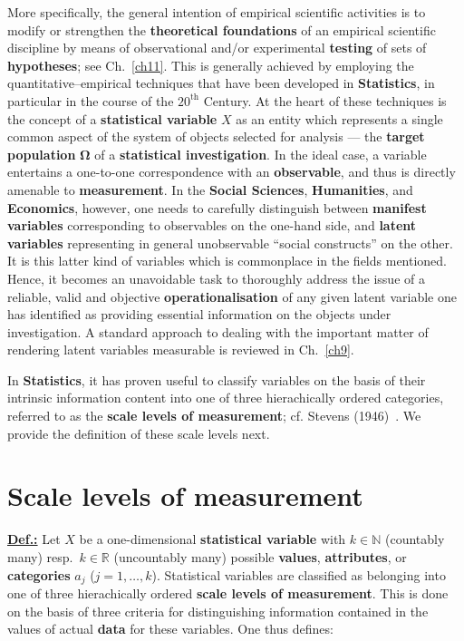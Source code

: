 \medskip
\noindent
More specifically, the general intention of empirical 
scientific activities is to modify or strengthen the
\textbf{theoretical foundations} of an empirical scientific
discipline by means of observational and/or experimental
\textbf{testing} of sets of \textbf{hypotheses}; see
Ch.~\ref{ch11}. This is generally 
achieved by employing the quantitative--empirical techniques that 
have been developed in \textbf{Statistics}, in particular in the 
course of the $20^\mathrm{th}$ Century. At the heart of these 
techniques is the concept of a \textbf{statistical variable} $X$ as 
an entity which represents a single common aspect of the system of 
objects selected for analysis --- the \textbf{target population} 
$\boldsymbol{\Omega}$ of a \textbf{statistical investigation}. In
the ideal case, a variable entertains a one-to-one correspondence
with an \textbf{observable}, and thus is directly amenable to
\textbf{measurement}. In the \textbf{Social Sciences},
\textbf{Humanities}, and \textbf{Economics}, however, one needs to
carefully distinguish between \textbf{manifest variables}
corresponding to observables on the one-hand side, and
\textbf{latent variables} representing in general unobservable
``social constructs'' on the other. It is this latter kind of
variables which is commonplace in the fields mentioned. Hence, it
becomes an unavoidable task to thoroughly address the issue of a
reliable, valid and objective \textbf{operationalisation} of any
given latent variable one has identified as providing essential
information on the objects under investigation. A standard approach
to dealing with the important matter of rendering latent variables
measurable is reviewed in Ch.~\ref{ch9}.

\medskip
\noindent
In \textbf{Statistics}, it has proven useful to classify variables
on the basis of their intrinsic information content into one of
three hierachically ordered categories, referred to as the
\textbf{scale levels of measurement}; cf. Stevens
(1946)~. We provide the definition of these scale
levels next.

\section[Scale levels of measurement]{Scale levels of measurement}
\underline{\textbf{Def.:}} Let $X$ be a one-dimensional
\textbf{statistical variable} with $k \in \mathbb{N}$ (countably
many) resp.\ $k \in \mathbb{R}$ (uncountably many) possible
\textbf{values}, \textbf{attributes}, or \textbf{categories}
$a_{j}$ ($j=1,\ldots,k$). Statistical variables
are classified as belonging into one of three hierachically ordered 
\textbf{scale levels of measurement}. This is done on the basis of 
three criteria for distinguishing information contained in the 
values of actual \textbf{data} for these variables. One thus
defines:

